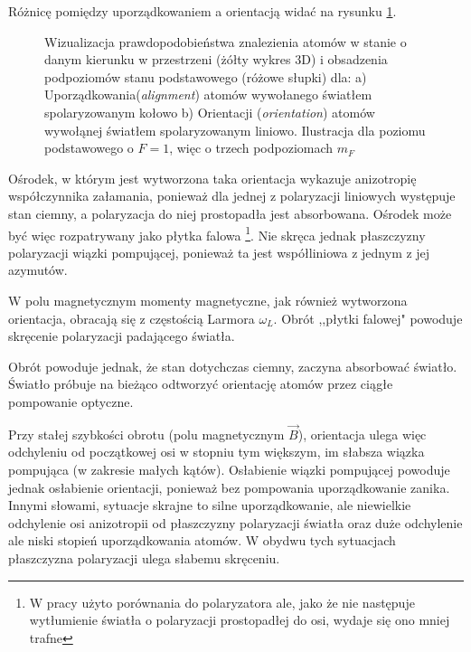 \documentclass[a4paper,10pt,twoside]{report}
\begin{document}
Różnicę pomiędzy uporządkowaniem a orientacją widać na rysunku \ref{alor}.

\begin{figure}[h!]

\caption{Wizualizacja prawdopodobieństwa znalezienia atomów w stanie o danym kierunku w przestrzeni (żółty wykres 3D) i obsadzenia podpoziomów stanu podstawowego (różowe słupki) dla: a) Uporządkowania(\textit{alignment}) atomów wywołanego światłem spolaryzowanym kołowo b) Orientacji (\textit{orientation}) atomów wywołąnej światłem spolaryzowanym liniowo. Ilustracja dla poziomu podstawowego o $F=1$, więc o trzech podpoziomach $m_F$}
\label{alor}
\end{figure}

Ośrodek, w którym jest wytworzona taka orientacja wykazuje anizotropię współczynnika załamania, ponieważ dla jednej z polaryzacji liniowych występuje stan ciemny, a polaryzacja do niej prostopadła jest absorbowana. Ośrodek może być więc rozpatrywany jako płytka falowa \footnote{W pracy \cite{rotpol} użyto porównania do polaryzatora ale, jako że nie następuje wytłumienie światła o polaryzacji prostopadłej do osi, wydaje się ono mniej trafne}.  Nie skręca jednak płaszczyzny polaryzacji wiązki pompującej, ponieważ ta jest współliniowa z jednym z jej azymutów.

W polu magnetycznym momenty magnetyczne, jak również wytworzona orientacja, obracają się z częstością Larmora $\omega_L$. Obrót ,,płytki falowej" powoduje skręcenie polaryzacji padającego światła.

Obrót powoduje jednak, że stan dotychczas ciemny, zaczyna absorbować światło. Światło próbuje na bieżąco odtworzyć orientację atomów przez ciągłe pompowanie optyczne.

Przy stałej szybkości obrotu (polu magnetycznym $\vec B$), orientacja ulega więc odchyleniu od początkowej osi w stopniu tym większym, im słabsza wiązka pompująca (w zakresie małych kątów). Osłabienie wiązki pompującej powoduje jednak osłabienie orientacji, ponieważ bez pompowania uporządkowanie zanika. Innymi słowami, sytuacje skrajne to silne uporządkowanie, ale niewielkie odchylenie osi anizotropii od płaszczyzny polaryzacji światła oraz duże odchylenie ale niski stopień uporządkowania atomów. W obydwu tych sytuacjach płaszczyzna polaryzacji ulega słabemu skręceniu.
\end{document}
